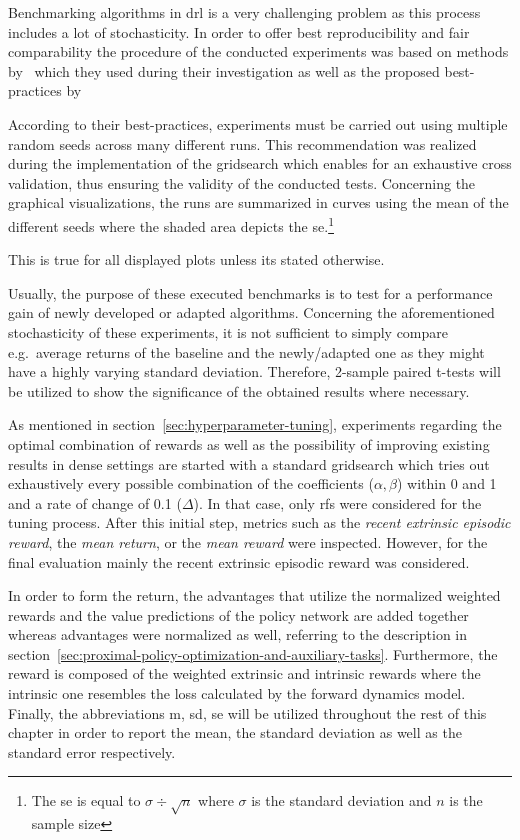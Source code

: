 \documentclass[draft,final]{vutinfth} %
\begin{document}
    Benchmarking algorithms in \gls{drl} is a very challenging problem as this process includes a lot of stochasticity.
    In order to offer best reproducibility and fair comparability the procedure of the conducted experiments was based on methods by~\cite{burda_large-scale_2018-1} which they used during their investigation as well as the proposed best-practices by \citeauthor{francois-lavet_introduction_2018}

    According to their best-practices, experiments must be carried out using multiple random seeds across many different runs.
    This recommendation was realized during the implementation of the gridsearch which enables for an exhaustive cross validation, thus ensuring the validity of the conducted tests.
    Concerning the graphical visualizations, the runs are summarized in curves using the mean of the different seeds where the shaded area depicts the \gls{se}.\footnote{The \gls{se} is equal to $\sigma \div \sqrt{n}$ where $\sigma$ is the standard deviation and $n$ is the sample size}

    This is true for all displayed plots unless its stated otherwise.

    Usually, the purpose of these executed benchmarks is to test for a performance gain of newly developed or adapted algorithms.
    Concerning the aforementioned stochasticity of these experiments, it is not sufficient to simply compare e.g.\ average returns of the baseline and the newly/adapted one as they might have a highly varying standard deviation.
    Therefore, 2-sample paired t-tests will be utilized to show the significance of the obtained results where necessary.

    As mentioned in section~\ref{sec:hyperparameter-tuning}, experiments regarding the optimal combination of rewards as well as the possibility of improving existing results in dense settings are started with a standard gridsearch which tries out exhaustively every possible combination of the coefficients ($\alpha,\beta$) within 0 and 1 and a rate of change of 0.1 ($\Delta$).
    In that case, only \glspl{rf} were considered for the tuning process.
    After this initial step, metrics such as the \textit{recent extrinsic episodic reward}, the \textit{mean return}, or the \textit{mean reward} were inspected.
    However, for the final evaluation mainly the recent extrinsic episodic reward was considered.

    In order to form the return, the advantages that utilize the normalized weighted rewards and the value predictions of the policy network are added together whereas advantages were normalized as well, referring to the description in section~\ref{sec:proximal-policy-optimization-and-auxiliary-tasks}.
    Furthermore, the reward is composed of the weighted extrinsic and intrinsic rewards where the intrinsic one resembles the loss calculated by the forward dynamics model.
    Finally, the abbreviations \acrshort{m}, \acrshort{sd}, \acrshort{se} will be utilized throughout the rest of this chapter in order to report the mean, the standard deviation as well as the standard error respectively.
\end{document}
